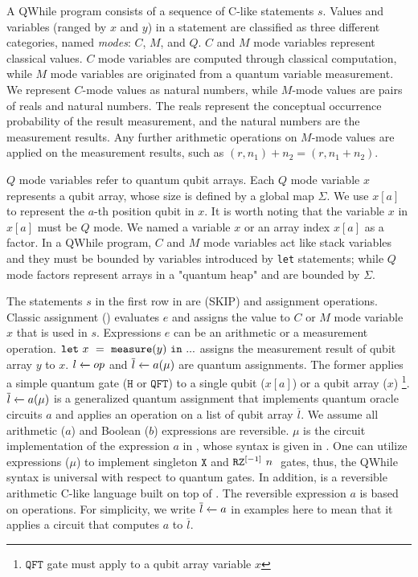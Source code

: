 A QWhile program consists of a sequence of C-like statements $s$.
Values and variables (ranged by $x$ and $y$) in a statement
are classified as three different categories, named \textit{modes}: $C$, $M$, and $Q$. 
$C$ and $M$ mode variables represent classical values. 
$C$ mode variables are computed through classical computation,
while $M$ mode variables are originated from a quantum variable measurement. 
We represent $C$-mode values as natural numbers, while $M$-mode values are pairs of reals and natural numbers.
The reals represent the conceptual occurrence probability of the result measurement,
and the natural numbers are the measurement results.
Any further arithmetic operations on $M$-mode values are applied on the measurement results,
such as $(r,n_1)+n_2=(r,n_1+n_2)$.

$Q$ mode variables refer to quantum qubit arrays.
Each $Q$ mode variable $x$ represents a qubit array, whose size is defined by a global map $\Sigma$.
We use $x[a]$ to represent the $a$-th position qubit in $x$.
It is worth noting that the variable $x$ in $x[a]$ must be $Q$ mode. 
We named a variable $x$ or an array index $x[a]$ as a factor.
In a QWhile program, $C$ and $M$ mode variables act like stack variables
and they must be bounded by variables introduced by \texttt{let} statements;
while $Q$ mode factors represent arrays in a "quantum heap" and are bounded by $\Sigma$.

The statements $s$ in the first row in  are \sskip (SKIP) and assignment operations.
Classic assignment () evaluates $e$ and assigns the value to $C$ or $M$ mode variable $x$ that is used in $s$.
Expressions $e$ can be an arithmetic or a measurement operation.
$\sexp{x}{\smea{y}}{...}$ assigns the measurement result of qubit array $y$ to $x$.
$\ssassign{l}{}{op}$ and $\ssassign{\overline{l}}{}{a(\mu)}$ are quantum assignments.
The former applies a simple quantum gate ($\texttt{H}$ or $\texttt{QFT}$)
to a single qubit ($x[a]$) or a qubit array ($x$) \footnote{$\texttt{QFT}$ gate must apply to a qubit array variable $x$}.
$\ssassign{\overline{l}}{}{a(\mu)}$ is a generalized quantum assignment that implements quantum oracle circuits $a$ and applies an \oqasm operation on a list of qubit array $\overline{l}$.
We assume all arithmetic ($a$) and Boolean ($b$) expressions are reversible. 
$\mu$ is the circuit implementation of the expression $a$ in \oqasm, whose syntax is given in .
One can utilize \oqasm expressions ($\mu$) to implement singleton $\texttt{X}$ and $\irz[\lbrack -1 \rbrack]{n}{}$ gates,
thus, the QWhile syntax is universal with respect to quantum gates.
In addition, \sourcelang is a reversible arithmetic C-like language built on top of \oqasm.
The reversible expression $a$ is based on \sourcelang operations.
For simplicity, we write $\ssassign{\overline{l}}{}{a}$ in examples here to
mean that it applies a \sourcelang circuit that computes $a$ to $\overline{l}$.

